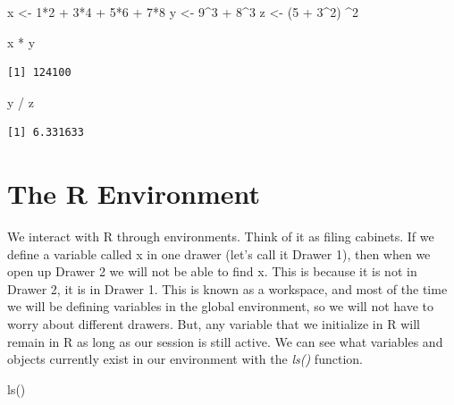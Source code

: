 \documentclass[
  letterpaper,
  DIV=11,
  numbers=noendperiod]{scrreprt}
\newenvironment{Shaded}{\begin{snugshade}}{\end{snugshade}}
\newcommand{\DecValTok}[1]{\textcolor[rgb]{0.68,0.00,0.00}{#1}}
\newcommand{\FunctionTok}[1]{\textcolor[rgb]{0.28,0.35,0.67}{#1}}
\newcommand{\NormalTok}[1]{\textcolor[rgb]{0.00,0.23,0.31}{#1}}
\newcommand{\OtherTok}[1]{\textcolor[rgb]{0.00,0.23,0.31}{#1}}
\newcommand{\SpecialCharTok}[1]{\textcolor[rgb]{0.37,0.37,0.37}{#1}}
\begin{document}
\begin{Shaded}
\begin{Highlighting}[]
\NormalTok{x }\OtherTok{\textless{}{-}} \DecValTok{1}\SpecialCharTok{*}\DecValTok{2} \SpecialCharTok{+} \DecValTok{3}\SpecialCharTok{*}\DecValTok{4} \SpecialCharTok{+} \DecValTok{5}\SpecialCharTok{*}\DecValTok{6} \SpecialCharTok{+} \DecValTok{7}\SpecialCharTok{*}\DecValTok{8}
\NormalTok{y }\OtherTok{\textless{}{-}} \DecValTok{9}\SpecialCharTok{\^{}}\DecValTok{3} \SpecialCharTok{+} \DecValTok{8}\SpecialCharTok{\^{}}\DecValTok{3}
\NormalTok{z }\OtherTok{\textless{}{-}}\NormalTok{ (}\DecValTok{5} \SpecialCharTok{+} \DecValTok{3}\SpecialCharTok{\^{}}\DecValTok{2}\NormalTok{) }\SpecialCharTok{\^{}}\DecValTok{2}

\NormalTok{x }\SpecialCharTok{*}\NormalTok{ y}
\end{Highlighting}
\end{Shaded}

\begin{verbatim}
[1] 124100
\end{verbatim}

\begin{Shaded}
\begin{Highlighting}[]
\NormalTok{y }\SpecialCharTok{/}\NormalTok{ z}
\end{Highlighting}
\end{Shaded}

\begin{verbatim}
[1] 6.331633
\end{verbatim}

\section{The R Environment}\label{the-r-environment}

We interact with R through environments. Think of it as filing cabinets.
If we define a variable called x in one drawer (let's call it Drawer 1),
then when we open up Drawer 2 we will not be able to find x. This is
because it is not in Drawer 2, it is in Drawer 1. This is known as a
workspace, and most of the time we will be defining variables in the
global environment, so we will not have to worry about different
drawers. But, any variable that we initialize in R will remain in R as
long as our session is still active. We can see what variables and
objects currently exist in our environment with the \emph{ls()}
function.

\begin{Shaded}
\begin{Highlighting}[]
\FunctionTok{ls}\NormalTok{()}
\end{Highlighting}
\end{Shaded}
\end{document}
